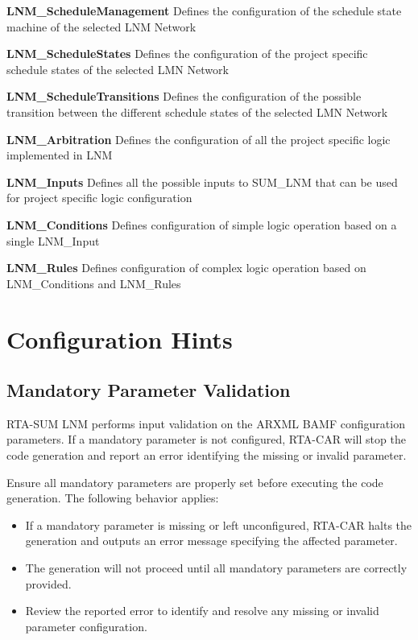 \quad\quad \textbf{LNM\_ScheduleManagement}\newline
\null\qquad Defines the configuration of the schedule state machine of the selected LNM Network

\qquad\qquad \textbf{LNM\_ScheduleStates}\newline
\null\qquad\qquad Defines the configuration of the project specific schedule states of the selected LMN Network

\qquad\qquad \textbf{LNM\_ScheduleTransitions}\newline
\null\qquad\qquad Defines the configuration of the possible transition between the different schedule states \newline
\null\qquad\qquad of the selected LMN Network

\textbf{LNM\_Arbitration}\newline
Defines the configuration of all the project specific logic implemented in LNM

\qquad \textbf{LNM\_Inputs}\newline
\null\qquad Defines all the possible inputs to SUM\_LNM that can be used for project specific logic configuration

\qquad \textbf{LNM\_Conditions}\newline
\null\qquad Defines configuration of simple logic operation based on a single LNM\_Input

\qquad \textbf{LNM\_Rules}\newline
\null\qquad Defines configuration of complex logic operation based on LNM\_Conditions and LNM\_Rules


\section{Configuration Hints}

\subsection{Mandatory Parameter Validation}
\label{sec:inputvalidation}
RTA-SUM LNM performs input validation on the ARXML BAMF configuration parameters.
If a mandatory parameter is not configured, RTA-CAR will stop the code generation and report an error identifying the missing or invalid parameter.

Ensure all mandatory parameters are properly set before executing the code generation. The following behavior applies:

\begin{itemize}
	\item If a mandatory parameter is missing or left unconfigured, RTA-CAR halts the generation and outputs an error message specifying the affected parameter.
	\item The generation will not proceed until all mandatory parameters are correctly provided.
	\item Review the reported error to identify and resolve any missing or invalid parameter configuration.
\end{itemize}

